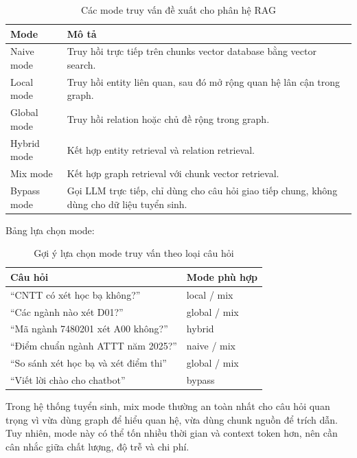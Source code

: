 \documentclass[12pt,a4paper]{report}
\begin{document}
\begin{table}[H]
\centering
\begin{tabular}{|p{3.2cm}|p{9.6cm}|}
\hline
\textbf{Mode} & \textbf{Mô tả} \\
\hline
Naive mode & Truy hồi trực tiếp trên chunks vector database bằng vector search. \\
\hline
Local mode & Truy hồi entity liên quan, sau đó mở rộng quan hệ lân cận trong graph. \\
\hline
Global mode & Truy hồi relation hoặc chủ đề rộng trong graph. \\
\hline
Hybrid mode & Kết hợp entity retrieval và relation retrieval. \\
\hline
Mix mode & Kết hợp graph retrieval với chunk vector retrieval. \\
\hline
Bypass mode & Gọi LLM trực tiếp, chỉ dùng cho câu hỏi giao tiếp chung, không dùng cho dữ liệu tuyển sinh. \\
\hline
\end{tabular}
\caption{Các mode truy vấn đề xuất cho phân hệ RAG}
\label{tab:rag-query-modes}
\end{table}

Bảng lựa chọn mode:

\begin{table}[H]
\centering
\begin{tabular}{|p{6cm}|p{6.8cm}|}
\hline
\textbf{Câu hỏi} & \textbf{Mode phù hợp} \\
\hline
``CNTT có xét học bạ không?'' & local / mix \\
\hline
``Các ngành nào xét D01?'' & global / mix \\
\hline
``Mã ngành 7480201 xét A00 không?'' & hybrid \\
\hline
``Điểm chuẩn ngành ATTT năm 2025?'' & naive / mix \\
\hline
``So sánh xét học bạ và xét điểm thi'' & global / mix \\
\hline
``Viết lời chào cho chatbot'' & bypass \\
\hline
\end{tabular}
\caption{Gợi ý lựa chọn mode truy vấn theo loại câu hỏi}
\label{tab:rag-mode-selection}
\end{table}

Trong hệ thống tuyển sinh, mix mode thường an toàn nhất cho câu hỏi quan trọng vì vừa dùng graph để hiểu quan hệ, vừa dùng chunk nguồn để trích dẫn. Tuy nhiên, mode này có thể tốn nhiều thời gian và context token hơn, nên cần cân nhắc giữa chất lượng, độ trễ và chi phí.
\end{document}
